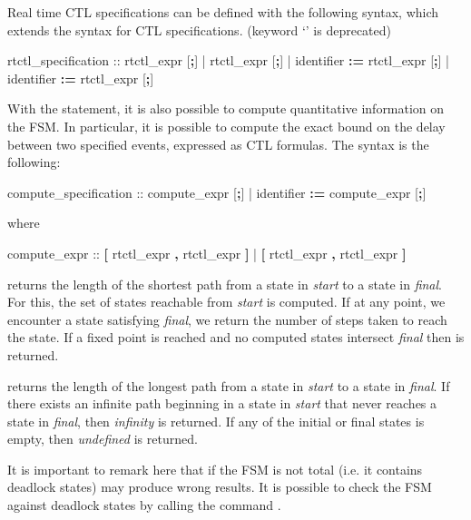 %
Real time CTL specifications can be defined with the following syntax,
which extends the syntax for CTL specifications. (keyword
`' is deprecated)
%
\begin{Grammar}
rtctl_specification ::  rtctl_expr [\textbf{;}]
                     |  rtctl_expr [\textbf{;}]
                     |   identifier \textbf{:=} rtctl_expr [\textbf{;}]
                     |   identifier \textbf{:=} rtctl_expr [\textbf{;}]
\end{Grammar}
%
With the  statement, it is also possible to compute
quantitative information on the FSM.
%
In particular, it is possible to compute the exact bound on the delay
between two specified events, expressed as CTL formulas.
%
The syntax is the following:
%
\begin{Grammar}
compute_specification ::  compute_expr [\textbf{;}]
                       |   identifier \textbf{:=} compute_expr [\textbf{;}]
\end{Grammar}
%
where
%
\begin{Grammar}
compute_expr ::  \textbf{[} rtctl_expr \textbf{,} rtctl_expr \textbf{]}
              |  \textbf{[} rtctl_expr \textbf{,} rtctl_expr \textbf{]}
\end{Grammar}
%
 returns the length of the shortest path from a state
in \textit{start} to a state in \textit{final}.
%
For this, the set of states reachable from \textit{start} is
computed.
%
If at any point, we encounter a state satisfying \textit{final}, we
return the number of steps taken to reach the state.
%
If a fixed point is reached and no computed states intersect
\textit{final} then  is returned.

\noindent{} returns the length of the longest path from a state
in \textit{start} to a state in \textit{final}.
%
If there exists an infinite path beginning in a state in
\textit{start} that never reaches a state in \textit{final}, then
\textit{infinity} is returned. If any of the initial or final states
is empty, then \textit{undefined} is returned.

It is important to remark here that if the FSM is not total (i.e. it
contains deadlock states)  may produce wrong
results. It is possible to check the FSM against deadlock states by
calling the command .


